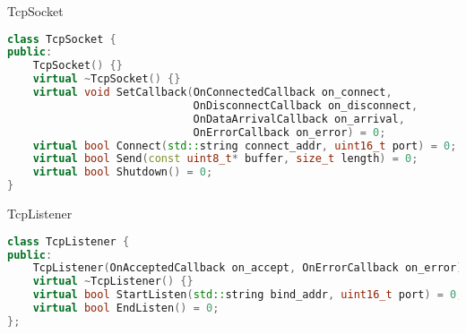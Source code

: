 \documentclass{beamer}
\begin{document}
\begin{frame}[fragile]{TcpSocket}
\newline
\begin{lstlisting}[language=c++]
class TcpSocket {
public:
    TcpSocket() {}
    virtual ~TcpSocket() {}
    virtual void SetCallback(OnConnectedCallback on_connect,
                             OnDisconnectCallback on_disconnect,
                             OnDataArrivalCallback on_arrival,
                             OnErrorCallback on_error) = 0;
    virtual bool Connect(std::string connect_addr, uint16_t port) = 0;
    virtual bool Send(const uint8_t* buffer, size_t length) = 0;
    virtual bool Shutdown() = 0;
}
\end{lstlisting}
\end{frame}

\begin{frame}[fragile]{TcpListener}
\newline
\begin{lstlisting}[language=c++]
class TcpListener {
public:
    TcpListener(OnAcceptedCallback on_accept, OnErrorCallback on_error);
    virtual ~TcpListener() {}
    virtual bool StartListen(std::string bind_addr, uint16_t port) = 0;
    virtual bool EndListen() = 0;
};
\end{lstlisting}
\end{frame}
\end{document}
